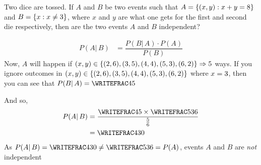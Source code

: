 


\question Two dice are tossed. If $A$ and $B$ be two events such that
$A = \lbrace(x,y) : x + y = 8\rbrace$ and $B = \lbrace x : x\neq3\rbrace$, 
where $x$ and $y$ are what one gets for the first and second die respectively, 
then are the two events $A$ and $B$ independent?


\watchout

\ifprintanswers
\fi 

\begin{solution}
	\begin{align}
  		P(A\vert\,B) &= \dfrac{P(B\vert\,A)\cdot P(A)}{P(B)}
  	\end{align}
  	Now, $A$ will happen if $(x,y) \in\lbrace(2,6),(3,5),(4,4),(5,3),(6,2)\rbrace \Rightarrow5$ ways.
  	If you ignore outcomes in $(x,y)\in\lbrace(2,6),(3,5),(4,4),(5,3),(6,2)\rbrace$ where $x=3$, then you can see 
  	that $P(B\vert\,A) = \WRITEFRAC\vbfive\vbfour$
  	
  	And so, \begin{align}
  		P(A\vert\, B) &= \dfrac{\WRITEFRAC\vbfive\vbfour\times\WRITEFRAC\vbfour{36}}{\frac{5}{6}} \\
  		&= \WRITEFRAC\vbfive{30}
  	\end{align}
  	As $P(A\vert\,B) = \WRITEFRAC\vbfive{30}\neq \WRITEFRAC\vbfour{36} = P(A)$, 
  	events $A$ and $B$ are \textit{not} independent
\end{solution}

